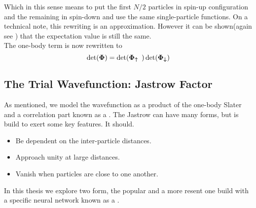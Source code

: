         Which in this sense means to put the first $N/2$ particles in spin-up
        configuration and the remaining in spin-down and use the same
        single-particle functions.  On a technical note, this rewriting is an
        approximation. However it can be shown(again see \cite{splitDet}) that
        the expectation value is still the same.\\
        The one-body term is now rewritten to
            \begin{equation}
                \det(\boldsymbol{{\Phi}}) = \det(\boldsymbol{{\Phi_{\uparrow}}})
                \det(\boldsymbol{{\Phi_{\downarrow}}})
                \label{eq:slatersplitdef}
            \end{equation}

    \subsection{The Trial Wavefunction: Jastrow Factor\label{susec:TWFJastrow}}
        As mentioned, we model the wavefunction as a product of the one-body
        Slater and a correlation part known as a . The
        Jastrow can have many forms, but is build to exert some key features.
        It should\cite{jastrow}. 
        \begin{itemize}
            \item Be dependent on the inter-particle distances.
            \item Approach unity at large distances.
            \item Vanish when particles are close to one another.
        \end{itemize}
        In this thesis we explore two form, the popular 
        and a more resent one build with a specific neural network known as a
        .

